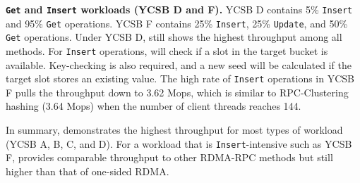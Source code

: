 \textbf{\texttt{Get} and \texttt{Insert} workloads (YCSB D and F).}
YCSB D contains  5\% \texttt{Insert} and 95\% \texttt{Get} operations. 
 YCSB F contains 25\% \texttt{Insert}, 25\% \texttt{Update}, and 50\% \texttt{Get} operations. 
Under YCSB D, \sys still shows the highest throughput among all methods. 
For \texttt{Insert} operations, \sys will check if a slot in the target bucket is available. Key-checking is also required, and a new seed will be calculated if the target slot stores an existing value. 
The high rate of \texttt{Insert} operations in YCSB F pulls the throughput down to 3.62 Mops, which is similar to RPC-Clustering hashing (3.64 Mops) when the number of client threads reaches 144.





In summary, \sys demonstrates the highest throughput for most types of workload (YCSB A, B, C, and D). For a workload that is \texttt{Insert}-intensive such as YCSB F, \sys provides comparable throughput to other RDMA-RPC methods but still higher than that of one-sided RDMA.









